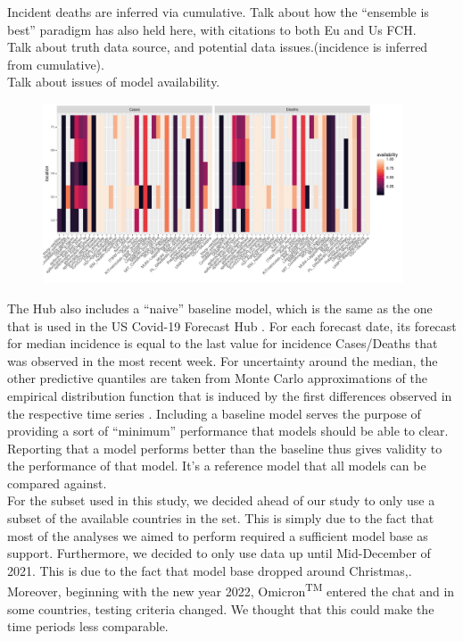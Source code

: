 Incident deaths are inferred via cumulative.
Talk about how the ``ensemble is best'' paradigm has also held here, with citations to both Eu and Us FCH.\\
Talk about truth data source, and potential data issues.(incidence is inferred from cumulative).\\
Talk about issues of model availability.\\
\begin{figure}
\includegraphics[width = 0.95\textwidth]{../plots/availability_indiv.pdf}
\end{figure}
The Hub also includes a ``naive'' baseline model, which is the same as the one that is used in the US Covid-19 Forecast Hub . For each forecast date, its forecast for median incidence is equal to the last value for incidence Cases/Deaths that was observed in the most recent week. For uncertainty around the median, the other predictive quantiles are taken from Monte Carlo approximations of the empirical distribution function that is induced by the first differences observed in the respective time series \citep{cramer_evaluation_nodate}. Including a baseline model serves the purpose of providing a sort of ``minimum'' performance that models should be able to clear. Reporting that a model performs better than the baseline thus gives validity to the performance of that model. It's a reference model that all models can be compared against. \\
For the subset used in this study, we decided ahead of our study to only use a subset of the available countries in the set. This is simply due to the fact that most of the analyses we aimed to perform required a sufficient model base as support. Furthermore, we decided to only use data up until Mid-December of 2021. This is due to the fact that model base dropped around Christmas,. Moreover, beginning with the new year 2022, Omicron\textsuperscript{TM} entered the chat and in some countries, testing criteria changed. We thought that this could make the time periods less comparable.\\
